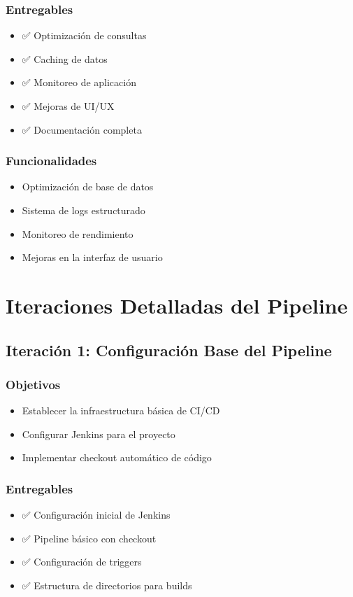 \documentclass[12pt,a4paper]{article}
\begin{document}
\subsubsection{Entregables}
\begin{itemize}
    \item ✅ Optimización de consultas
    \item ✅ Caching de datos
    \item ✅ Monitoreo de aplicación
    \item ✅ Mejoras de UI/UX
    \item ✅ Documentación completa
\end{itemize}

\subsubsection{Funcionalidades}
\begin{itemize}
    \item Optimización de base de datos
    \item Sistema de logs estructurado
    \item Monitoreo de rendimiento
    \item Mejoras en la interfaz de usuario
\end{itemize}

\section{Iteraciones Detalladas del Pipeline}

\subsection{Iteración 1: Configuración Base del Pipeline}

\subsubsection{Objetivos}
\begin{itemize}
    \item Establecer la infraestructura básica de CI/CD
    \item Configurar Jenkins para el proyecto
    \item Implementar checkout automático de código
\end{itemize}

\subsubsection{Entregables}
\begin{itemize}
    \item ✅ Configuración inicial de Jenkins
    \item ✅ Pipeline básico con checkout
    \item ✅ Configuración de triggers
    \item ✅ Estructura de directorios para builds
\end{itemize}
\end{document}
